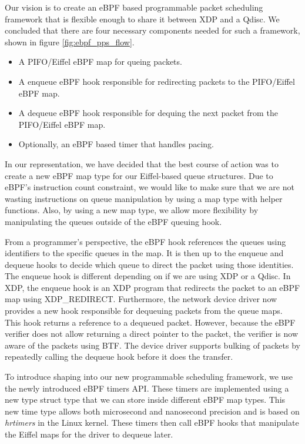 \documentclass[sigconf, nonacm]{acmart}
\begin{document}
Our vision is to create an eBPF based programmable packet scheduling framework
that is flexible enough to share it between XDP and a Qdisc. We concluded that
there are four necessary components needed for such a framework, shown in figure
\ref{fig:ebpf_pps_flow}.

\begin{itemize}
        \item A PIFO/Eiffel eBPF map for queing packets.
        \item A enqueue eBPF hook responsible for redirecting packets to the PIFO/Eiffel eBPF map.
        \item A dequeue eBPF hook responsible for dequing the next packet from the PIFO/Eiffel eBPF map.
        \item Optionally, an eBPF based timer that handles pacing.
\end{itemize}


In our representation, we have decided that the best course of action was to
create a new eBPF map type for our Eiffel-based queue structures. Due to eBPF's
instruction count constraint, we would like to make sure that we are not wasting
instructions on queue manipulation by using a map type with helper functions.
Also, by using a new map type, we allow more flexibility by manipulating the
queues outside of the eBPF queuing hook.

From a programmer's perspective, the eBPF hook references the queues using
identifiers to the specific queues in the map. It is then up to the enqueue and
dequeue hooks to decide which queue to direct the packet using those identities.
The enqueue hook is different depending on if we are using XDP or a Qdisc. In
XDP, the enqueue hook is an XDP program that redirects the packet to an eBPF map
using XDP\_REDIRECT. Furthermore, the network device driver now provides a new
hook responsible for dequeuing packets from the queue maps. This hook returns a
reference to a dequeued packet. However, because the eBPF verifier does not
allow returning a direct pointer to the packet, the verifier is now aware of the
packets using BTF. The device driver supports bulking of packets by repeatedly
calling the dequeue hook before it does the transfer.

To introduce shaping into our new programmable scheduling framework, we use the
newly introduced eBPF timers API. These timers are implemented using a new type
struct type that we can store inside different eBPF map types. This new time
type allows both microsecond and nanosecond precision and is based on
\textit{hrtimers} in the Linux kernel. These timers then call eBPF hooks that
manipulate the Eiffel maps for the driver to dequeue later.
\end{document}
